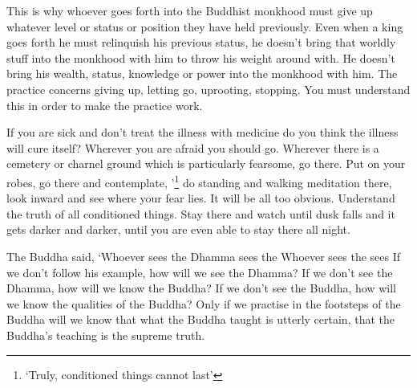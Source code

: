 This is why whoever goes forth into the Buddhist monkhood must give up whatever level or status or position they have held previously. Even when a king goes forth he must relinquish his previous status, he doesn't bring that worldly stuff into the monkhood with him to throw his weight around with. He doesn't bring his wealth, status, knowledge or power into the monkhood with him. The practice concerns giving up, letting go, uprooting, stopping. You must understand this in order to make the practice work. 

If you are sick and don't treat the illness with medicine do you think the illness will cure itself? Wherever you are afraid you should go. Wherever there is a cemetery or charnel ground which is particularly fearsome, go there. Put on your robes, go there and contemplate, '\footnote{`Truly, conditioned things cannot last'} do standing and walking meditation there, look inward and see where your fear lies. It will be all too obvious. Understand the truth of all conditioned things. Stay there and watch until dusk falls and it gets darker and darker, until you are even able to stay there all night. 

The Buddha said, `Whoever sees the Dhamma sees the  Whoever sees the  sees  If we don't follow his example, how will we see the Dhamma? If we don't see the Dhamma, how will we know the Buddha? If we don't see the Buddha, how will we know the qualities of the Buddha? Only if we practise in the footsteps of the Buddha will we know that what the Buddha taught is utterly certain, that the Buddha's teaching is the supreme truth. 

